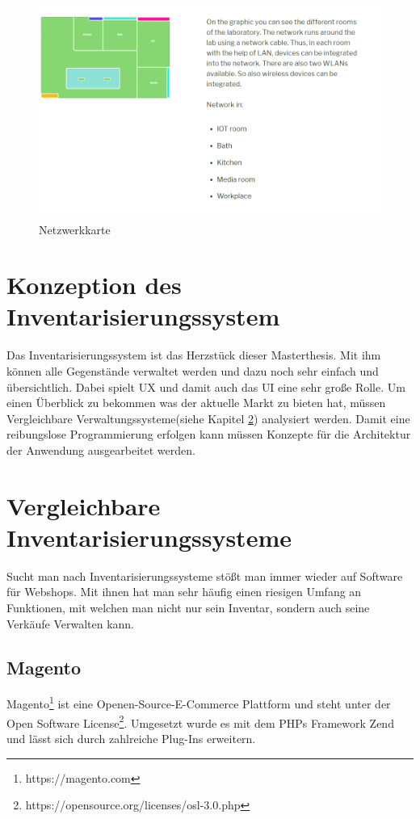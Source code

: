 \begin{figure}[H]
	\centering
	\includegraphics[scale=0.35]{content/pictures/network.png}
	\caption{Netzwerkkarte}
	\label{fig:network}
\end{figure}

\section{Konzeption des Inventarisierungssystem}
\label{konzept:inventar}
Das Inventarisierungssystem ist das Herzstück dieser Masterthesis. Mit ihm können alle Gegenstände verwaltet werden und dazu noch sehr einfach und übersichtlich. Dabei spielt \acf{UX} und damit auch das \acf{UI} eine sehr große Rolle. Um einen Überblick zu bekommen was der aktuelle Markt zu bieten hat, müssen Vergleichbare Verwaltungssysteme(siehe Kapitel \ref{konzept:vergleich}) analysiert werden. Damit eine reibungslose Programmierung erfolgen kann müssen Konzepte für die Architektur der Anwendung ausgearbeitet werden.


\section{Vergleichbare Inventarisierungssysteme}
\label{konzept:vergleich}

Sucht man nach Inventarisierungssysteme stößt man immer wieder auf Software für Webshops. Mit ihnen hat man sehr häufig einen riesigen Umfang an Funktionen, mit welchen man nicht nur sein Inventar, sondern auch seine Verkäufe Verwalten kann.

\subsection{Magento}
\label{konzeption:magento}
Magento\footnote{https://magento.com} ist eine Openen-Source-E-Commerce Plattform und steht unter der Open Software License\footnote{https://opensource.org/licenses/osl-3.0.php}. Umgesetzt wurde es mit dem \acp{PHP} Framework Zend und lässt sich durch zahlreiche Plug-Ins erweitern.\autocite{.2018}

